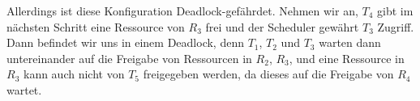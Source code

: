 \documentclass[numbers=noendperiod]{scrartcl}
\begin{document}
	Allerdings ist diese Konfiguration Deadlock-gefährdet. Nehmen wir an, $T_4$ gibt im nächsten Schritt eine Ressource von $R_3$ frei und der Scheduler gewährt $T_3$ Zugriff. Dann befindet wir uns in einem Deadlock, denn $T_1$, $T_2$ und $T_3$ warten dann untereinander auf die Freigabe von Ressourcen in $R_2$, $R_3$, und eine Ressource in $R_3$ kann auch nicht von $T_5$ freigegeben werden, da dieses auf die Freigabe von $R_4$ wartet.
	
\end{document}
